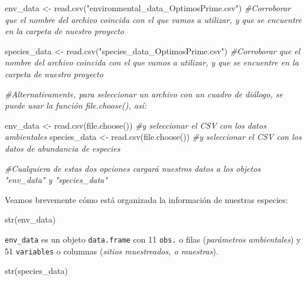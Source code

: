 \documentclass[
]{book}
\newenvironment{Shaded}{\begin{snugshade}}{\end{snugshade}}
\newcommand{\CommentTok}[1]{\textcolor[rgb]{0.56,0.35,0.01}{\textit{#1}}}
\newcommand{\FunctionTok}[1]{\textcolor[rgb]{0.00,0.00,0.00}{#1}}
\newcommand{\NormalTok}[1]{#1}
\newcommand{\OtherTok}[1]{\textcolor[rgb]{0.56,0.35,0.01}{#1}}
\newcommand{\StringTok}[1]{\textcolor[rgb]{0.31,0.60,0.02}{#1}}
\begin{document}
\begin{Shaded}
\begin{Highlighting}[]
\NormalTok{env\_data }\OtherTok{\textless{}{-}} \FunctionTok{read.csv}\NormalTok{(}\StringTok{"environmental\_data\_OptimosPrime.csv"}\NormalTok{) }\CommentTok{\#Corroborar que el nombre del archivo coincida con el que vamos a utilizar, y que se encuentre en la carpeta de nuestro proyecto}

\NormalTok{species\_data }\OtherTok{\textless{}{-}} \FunctionTok{read.csv}\NormalTok{(}\StringTok{"species\_data\_OptimosPrime.csv"}\NormalTok{) }\CommentTok{\#Corroborar que el nombre del archivo coincida con el que vamos a utilizar, y que se encuentre en la carpeta de nuestro proyecto}

\CommentTok{\#Alternativamente, para seleccionar un archivo con un cuadro de diálogo, se puede usar la función \textasciigrave{}file.choose()\textasciigrave{}, así:}

\NormalTok{env\_data }\OtherTok{\textless{}{-}} \FunctionTok{read.csv}\NormalTok{(}\FunctionTok{file.choose}\NormalTok{()) }\CommentTok{\#y seleccionar el CSV con los datos ambientales}
\NormalTok{species\_data }\OtherTok{\textless{}{-}} \FunctionTok{read.csv}\NormalTok{(}\FunctionTok{file.choose}\NormalTok{()) }\CommentTok{\#y seleccionar el CSV con los datos de abundancia de especies}

\CommentTok{\#Cualquiera de estas dos opciones cargará nuestros datos a los objetos "env\_data" y "species\_data"}
\end{Highlighting}
\end{Shaded}

Veamos brevemente cómo está organizada la información de nuestras especies:

\begin{Shaded}
\begin{Highlighting}[]
\FunctionTok{str}\NormalTok{(env\_data)}
\end{Highlighting}
\end{Shaded}

\texttt{env\_data} es un objeto \texttt{data.frame} con 11 \texttt{obs.} o filas (\emph{parámetros ambientales}) y 51 \texttt{variables} o columnas (\emph{sitios muestreados, o muestras}).

\begin{Shaded}
\begin{Highlighting}[]
\FunctionTok{str}\NormalTok{(species\_data)}
\end{Highlighting}
\end{Shaded}
\end{document}
